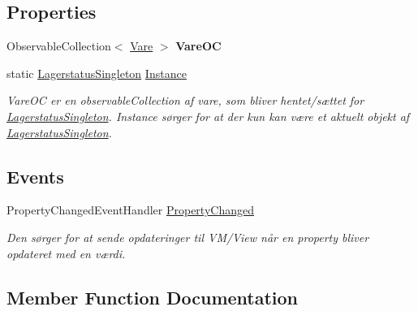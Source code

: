 \subsection*{Properties}
\begin{DoxyCompactItemize}
\item 
\mbox{\label{class_r_f_storage_1_1_model_1_1_lagerstatus_singleton_a1778cade022db1bd5e05605fdf2e2f22}} 
Observable\+Collection$<$ \mbox{\hyperlink{class_r_f_storage_1_1_model_1_1_vare}{Vare}} $>$ {\bfseries Vare\+OC}
\item 
static \mbox{\hyperlink{class_r_f_storage_1_1_model_1_1_lagerstatus_singleton}{Lagerstatus\+Singleton}} \mbox{\hyperlink{class_r_f_storage_1_1_model_1_1_lagerstatus_singleton_acc6cbbcfb1f6e4d33090692f1089dadc}{Instance}}
\begin{DoxyCompactList}\small\item\em Vare\+OC er en observable\+Collection af vare, som bliver hentet/sættet for \mbox{\hyperlink{class_r_f_storage_1_1_model_1_1_lagerstatus_singleton}{Lagerstatus\+Singleton}}. Instance sørger for at der kun kan være et aktuelt objekt af \mbox{\hyperlink{class_r_f_storage_1_1_model_1_1_lagerstatus_singleton}{Lagerstatus\+Singleton}}. \end{DoxyCompactList}\end{DoxyCompactItemize}
\subsection*{Events}
\begin{DoxyCompactItemize}
\item 
Property\+Changed\+Event\+Handler \mbox{\hyperlink{class_r_f_storage_1_1_model_1_1_lagerstatus_singleton_a9dec22a87bd75429a7f96a7528c07f85}{Property\+Changed}}
\begin{DoxyCompactList}\small\item\em Den sørger for at sende opdateringer til V\+M/\+View når en property bliver opdateret med en værdi. \end{DoxyCompactList}\end{DoxyCompactItemize}


\subsection{Member Function Documentation}
\mbox{\label{class_r_f_storage_1_1_model_1_1_lagerstatus_singleton_a81e8d9c0d1e8504bf74378959be79011}} 
